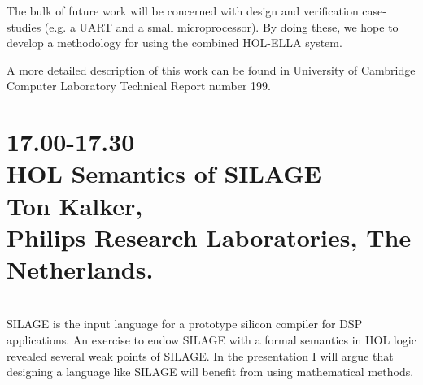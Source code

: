 The bulk of future work will be concerned with design and verification
case-studies (e.g. a UART and a small microprocessor). By doing these, we hope
to develop a methodology for using the combined HOL-ELLA system.

A more detailed description of this work can be found in University of
Cambridge Computer Laboratory Technical Report number 199.

\newpage
\section*{17.00-17.30\\
HOL Semantics of SILAGE\\
Ton Kalker, \\
\large\bf Philips Research Laboratories, The Netherlands.}

\\

\noindent
SILAGE is the input language for a prototype silicon compiler for DSP
applications.  An exercise to endow SILAGE with a formal semantics in
HOL logic revealed several weak points of SILAGE.  In the presentation
I will argue that designing a language like SILAGE will benefit from
using mathematical methods.



